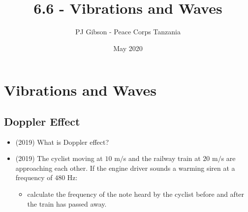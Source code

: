 \documentclass{article}
\title{6.6 - Vibrations and Waves}
\author{PJ Gibson - Peace Corps Tanzania}
\date{May 2020}
\begin{document}
\maketitle


\section{Vibrations and Waves}

\subsection{Doppler Effect}
\begin{itemize}
\item (2019)  What is Doppler effect? 
\item (2019)  The cyclist moving at $ 10$ m$/$s and the railway train at $ 20$ m$/$s are approaching each other. If the engine driver sounds a warming siren at a frequency of $ 480$ Hz:
 \begin{itemize}
\item calculate the frequency of the note heard by the cyclist before and after the train has passed away. 
\end{itemize}
\end{itemize}
\end{document}
